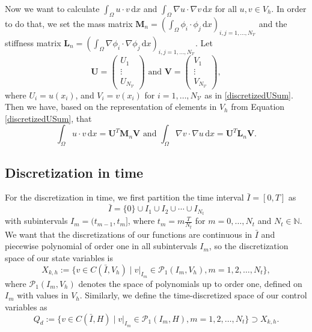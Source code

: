 Now we want to calculate $\int_\Omega u \cdot v \,\mathrm{d}x$ and $\int_\Omega \nabla u \cdot \nabla v \,\mathrm{d}x$ for all $u,v\in  V_h$. In order to do that, we set the mass matrix $\mathbf{M}_n = \left(\int_\Omega \phi_i \cdot \phi_j \,\mathrm{d}x\right)_{i,j=1,\dotsc,N_\mathcal{V}}$ and the stiffness matrix $\mathbf{L}_n = \left(\int_\Omega \nabla\phi_i \cdot \nabla\phi_j \,\mathrm{d}x\right)_{i,j=1,\dotsc,N_\mathcal{V}}$. Let%
\begin{displaymath}
\mathbf{U}=\begin{pmatrix} U_1 \\ \vdots \\ U_{N_\mathcal{V}} \end{pmatrix}\text{ and }\mathbf{V}=\begin{pmatrix} V_1 \\ \vdots \\ V_{N_\mathcal{V}} \end{pmatrix},
\end{displaymath}
where $U_i=u(x_i)$, and $V_i=v(x_i)$ for $i=1,\dotsc,N_\mathcal{V}$ as in \eqref{discretizedUSum}. Then we have, based on the representation of elements in $V_h$ from Equation \eqref{discretizedUSum}, that
\begin{displaymath}
\int_\Omega u \cdot v \,\mathrm{d}x=\mathbf{U}^T\mathbf{M}_n\mathbf{V}\text{ and }\int_\Omega \nabla v \cdot \nabla u \,\mathrm{d}x=\mathbf{U}^T\mathbf{L}_n\mathbf{V}.
\end{displaymath}


\subsection{\label{SubsectionDiscretizationInTime}Discretization in time}
For the discretization in time, we first partition the time interval $\bar{I}=[0,T]$ as
\begin{displaymath}
\bar{I}=\{0\}\cup I_1\cup I_2\cup\dotsb\cup I_{N_t}
\end{displaymath}
with subintervals $I_m=(t_{m-1},t_m]$, where $t_m=m\frac{T}{N_t}$ for $m=0,\dotsc, N_t$ and $N_t\in\mathbb{N}$. We want that the discretizations of our functions are continuous in $\bar{I}$ and piecewise polynomial of order one in all subintervals $I_m$, so the discretization space of our state variables is
\begin{displaymath}
X_{k,h}:=\{v\in C(\bar{I},V_h)\mid v |_{I_m}\in\mathcal{P}_1(I_m,V_h),m=1,2,\dotsc,N_t\},
\end{displaymath}
where $\mathcal{P}_1(I_m,V_h)$ denotes the space of polynomials up to order one, defined on $I_m$ with values in $V_h$.
Similarly, we define the time-discretized space of our control variables as
\begin{displaymath}
Q_d:=\{v\in C(\bar{I},H)\mid v |_{I_m}\in\mathcal{P}_1(I_m,H),m=1,2,\dotsc,N_t\}\supset X_{k,h}.
\end{displaymath}

